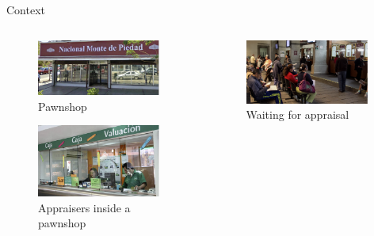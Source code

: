 \documentclass[8pt]{beamer}
\begin{document}
\begin{frame}{Context}
\begin{columns}
\begin{column}{.45\textwidth}
\begin{figure}[H]
    \begin{center}
    \caption{Pawnshop}
        \includegraphics[width=0.95\textwidth]{Figuras/empenio2.png}
    \end{center}
    \end{figure}
\begin{figure}[H]
    \begin{center}
    \caption{Appraisers  inside a pawnshop}
        \includegraphics[width=0.95\textwidth]{Figuras/empenio9.png}
    \end{center}
    \end{figure}    
    \end{column}
\begin{column}{.45\textwidth}
\begin{figure}[H]
    \begin{center}
    \caption{Waiting for appraisal}
        \includegraphics[width=0.95\textwidth]{Figuras/empenio11.png}

\end{center}
\end{figure}
\end{column}
\end{columns}
\end{frame}
\end{document}

